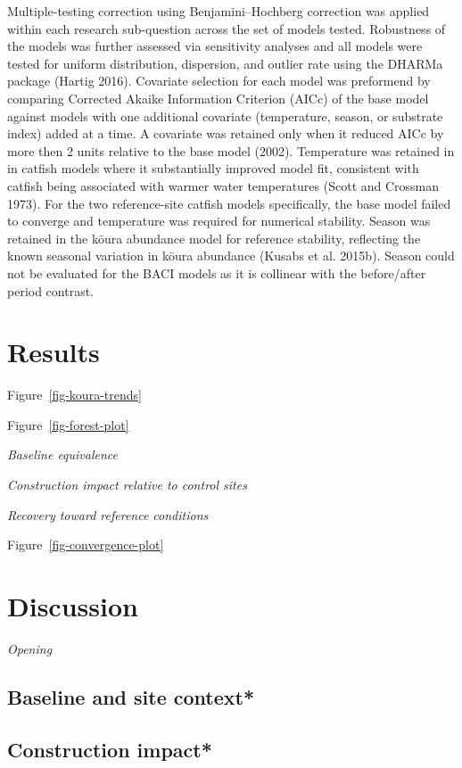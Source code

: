\documentclass[
  12pt,
  a4paper,
  oneside]{scrbook}
\begin{document}
Multiple-testing correction using Benjamini--Hochberg correction was
applied within each research sub-question across the set of models
tested. Robustness of the models was further assessed via sensitivity
analyses and all models were tested for uniform distribution,
dispersion, and outlier rate using the DHARMa package (Hartig 2016).
Covariate selection for each model was preformend by comparing Corrected
Akaike Information Criterion (AICc) of the base model against models
with one additional covariate (temperature, season, or substrate index)
added at a time. A covariate was retained only when it reduced AICc by
more then 2 units relative to the base model (2002). Temperature was
retained in in catfish models where it substantially improved model fit,
consistent with catfish being associated with warmer water temperatures
(Scott and Crossman 1973). For the two reference-site catfish models
specifically, the base model failed to converge and temperature was
required for numerical stability. Season was retained in the kōura
abundance model for reference stability, reflecting the known seasonal
variation in kōura abundance (Kusabs et al. 2015b). Season could not be
evaluated for the BACI models as it is collinear with the before/after
period contrast.

\section{Results}\label{results-3}

Figure~\ref{fig-koura-trends}

Figure~\ref{fig-forest-plot}

\emph{Baseline equivalence}

\emph{Construction impact relative to control sites}

\emph{Recovery toward reference conditions}

Figure~\ref{fig-convergence-plot}

\section{Discussion}\label{discussion-3}

\emph{Opening}

\subsection{Baseline and site context*}\label{baseline-and-site-context}

\subsection{Construction impact*}\label{construction-impact}
\end{document}
